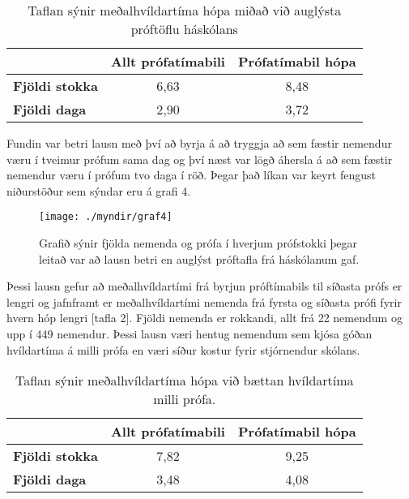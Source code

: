 \documentclass[12pt]{article}
\begin{document}
\begin{table}[h]
    \centering
    \begin{tabular}{l|c|c|}
        \cline{2-3}
        & \multicolumn{1}{l|}{\textbf{Allt prófatímabili}} & \multicolumn{1}{l|}{\textbf{Prófatímabil hópa}} \\ \hline
        \multicolumn{1}{|l|}{\textbf{Fjöldi stokka}} & 6,63                                             & 8,48                                            \\ \hline
        \multicolumn{1}{|l|}{\textbf{Fjöldi daga}}   & 2,90                                             & 3,72                                            \\ \hline
    \end{tabular}
    \caption{Taflan sýnir meðalhvíldartíma hópa miðað við auglýsta próftöflu háskólans}
\end{table}

Fundin var betri lausn með því að byrja á að tryggja að sem fæstir nemendur væru í tveimur prófum sama dag og því næst var lögð áhersla á að sem fæstir nemendur væru í prófum tvo daga í röð. Þegar það líkan var keyrt fengust niðurstöður sem sýndar eru á grafi 4.


\begin{figure}[h]
    \centering
    \texttt{[image: ./myndir/graf4]}
    \caption{Grafið sýnir fjölda nemenda og prófa í hverjum prófstokki þegar leitað var að lausn betri en auglýst próftafla frá háskólanum gaf.}
\end{figure}

\newpage

Þessi lausn gefur að meðalhvíldartími frá byrjun próftímabils til síðasta prófs er lengri og jafnframt er meðalhvíldartími nemenda frá fyrsta og síðasta prófi fyrir hvern hóp lengri [tafla 2]. 
Fjöldi nemenda er rokkandi, allt frá 22 nemendum og upp í 449 nemendur. Þessi lausn væri hentug nemendum sem kjósa góðan hvíldartíma á milli prófa en væri síður kostur fyrir stjórnendur skólans.


\begin{table}[h]
    \centering
    \begin{tabular}{l|c|c|}
        \cline{2-3}
        & \multicolumn{1}{l|}{\textbf{Allt prófatímabili}} & \multicolumn{1}{l|}{\textbf{Prófatímabil hópa}} \\ \hline
        \multicolumn{1}{|l|}{\textbf{Fjöldi stokka}} & 7,82                                             & 9,25                                            \\ \hline
        \multicolumn{1}{|l|}{\textbf{Fjöldi daga}}   & 3,48                                             & 4,08                                            \\ \hline
    \end{tabular}
    \caption{Taflan sýnir meðalhvíldartíma hópa við bættan hvíldartíma milli prófa.}
\end{table}
\end{document}
